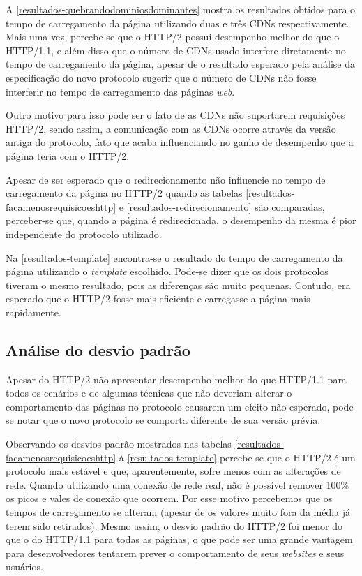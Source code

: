 

A \autoref{resultados-quebrandodominiosdominantes} mostra os resultados obtidos para o tempo de carregamento da página utilizando duas e três CDNs respectivamente. Mais uma vez, percebe-se que o HTTP/2 possui desempenho melhor do que o HTTP/1.1, e além disso que o número de CDNs usado interfere diretamente no tempo de carregamento da página, apesar de o resultado esperado pela análise da especificação do novo protocolo sugerir que o número de CDNs não fosse interferir no tempo de carregamento das páginas \textit{web}.

Outro motivo para isso pode ser o fato de as CDNs não suportarem requisições HTTP/2, sendo assim, a comunicação com as CDNs ocorre através da versão antiga do protocolo, fato que acaba influenciando no ganho de desempenho que a página teria com o HTTP/2.



Apesar de ser esperado que o redirecionamento não influencie no tempo de carregamento da página no HTTP/2 quando as tabelas \ref{resultados-facamenosrequisicoeshttp} e \ref{resultados-redirecionamento} são comparadas, perceber-se que, quando a página é redirecionada, o desempenho da mesma é pior independente do protocolo utilizado.



Na \autoref{resultados-template} encontra-se o resultado do tempo de carregamento da página utilizando o \textit{template} escolhido. Pode-se dizer que os dois protocolos tiveram o mesmo resultado, pois as diferenças são muito pequenas. Contudo, era esperado que o HTTP/2 fosse mais eficiente e carregasse a página mais rapidamente.

\subsection{Análise do desvio padrão}
\label{desviopadrao}

Apesar do HTTP/2 não apresentar desempenho melhor do que HTTP/1.1 para todos os cenários e de algumas técnicas que não deveriam alterar o comportamento das páginas no protocolo causarem um efeito não esperado, pode-se notar que o novo protocolo se comporta diferente de sua versão prévia.

Observando os desvios padrão mostrados nas tabelas \ref{resultados-facamenosrequisicoeshttp} à \ref{resultados-template} percebe-se que o HTTP/2 é um protocolo mais estável e que, aparentemente, sofre menos com as alterações de rede. Quando utilizando uma conexão de rede real, não é possível remover 100\% os picos e vales de conexão que ocorrem. Por esse motivo percebemos que os tempos de carregamento se alteram (apesar de os valores muito fora da média já terem sido retirados). Mesmo assim, o desvio padrão do HTTP/2 foi menor do que o do HTTP/1.1 para todas as páginas, o que pode ser uma grande vantagem para desenvolvedores tentarem prever o comportamento de seus \textit{websites} e seus usuários.

